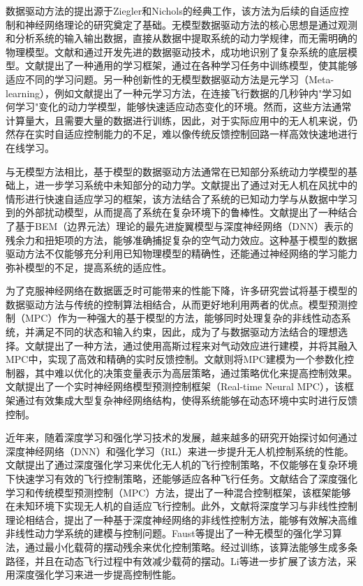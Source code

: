\documentclass[lang=chs, degree=master, blindreview=false, winfonts=true]{yanputhesis}
\begin{document}
数据驱动方法的提出源于Ziegler和Nichols的经典工作\cite{ziegler1942optimum}，该方法为后续的自适应控制\cite{wittenmark1989adaptive}和神经网络理论\cite{werbos1989neural}的研究奠定了基础。无模型数据驱动方法的核心思想是通过观测和分析系统的输入输出数据，直接从数据中提取系统的动力学规律，而无需明确的物理模型。文献\cite{lusch2018deep}和\cite{hewing2019cautious}通过开发先进的数据驱动技术，成功地识别了复杂系统的底层模型。文献\cite{finn2017model}提出了一种通用的学习框架，通过在各种学习任务中训练模型，使其能够适应不同的学习问题。另一种创新性的无模型数据驱动方法是元学习（Meta-learning），例如文献\cite{belkhale2021model}提出了一种元学习方法，在连接飞行数据的几秒钟内"学习如何学习"变化的动力学模型，能够快速适应动态变化的环境。然而，这些方法通常计算量大，且需要大量的数据进行训练，因此，对于实际应用中的无人机来说，仍然存在实时自适应控制能力的不足，难以像传统反馈控制回路一样高效快速地进行在线学习。

与无模型方法相比，基于模型的数据驱动方法通常在已知部分系统动力学模型的基础上，进一步学习系统中未知部分的动力学。文献\cite{o2022neural}提出了通过对无人机在风扰中的情形进行快速自适应学习的框架，该方法结合了系统的已知动力学与从数据中学习到的外部扰动模型，从而提高了系统在复杂环境下的鲁棒性。文献\cite{Bauersfeld2021}提出了一种结合了基于BEM（边界元法）理论的最先进旋翼模型与深度神经网络（DNN）表示的残余力和扭矩项的方法，能够准确捕捉复杂的空气动力效应。这种基于模型的数据驱动方法不仅能够充分利用已知物理模型的精确性，还能通过神经网络的学习能力弥补模型的不足，提高系统的适应性。

为了克服神经网络在数据匮乏时可能带来的性能下降，许多研究尝试将基于模型的数据驱动方法与传统的控制算法相结合，从而更好地利用两者的优点。模型预测控制（MPC）作为一种强大的基于模型的方法，能够同时处理复杂的非线性动态系统，并满足不同的状态和输入约束\cite{neunert2016fast}，因此，成为了与数据驱动方法结合的理想选择。文献\cite{torrente2021data}提出了一种方法，通过使用高斯过程来对气动效应进行建模，并将其融入MPC中，实现了高效和精确的实时反馈控制。文献\cite{song2022policy}则将MPC建模为一个参数化控制器，其中难以优化的决策变量表示为高层策略，通过策略优化来提高控制效果。文献\cite{salzmann2023real}提出了一个实时神经网络模型预测控制框架（Real-time Neural MPC），该框架通过有效集成大型复杂神经网络结构，使得系统能够在动态环境中实时进行反馈控制。

近年来，随着深度学习和强化学习技术的发展，越来越多的研究开始探讨如何通过深度神经网络（DNN）和强化学习（RL）来进一步提升无人机控制系统的性能。文献\cite{zhu2019deep}提出了通过深度强化学习来优化无人机的飞行控制策略，不仅能够在复杂环境下快速学习有效的飞行控制策略，还能够适应各种飞行任务。文献\cite{gao2020model}结合了深度强化学习和传统模型预测控制（MPC）方法，提出了一种混合控制框架，该框架能够在未知环境下实现无人机的自适应飞行控制。此外，文献\cite{li2022learning}将深度学习与非线性控制理论相结合，提出了一种基于深度神经网络的非线性控制方法，能够有效解决高维非线性动力学系统的建模与控制问题。Faust等\cite{faust2017automated}提出了一种无模型的强化学习算法，通过最小化载荷的摆动残余来优化控制策略。经过训练，该算法能够生成多条路径，并且在动态飞行过程中有效减少载荷的摆动。Li等\cite{li2022deep}进一步扩展了该方法，采用深度强化学习来进一步提高控制性能。
\end{document}
